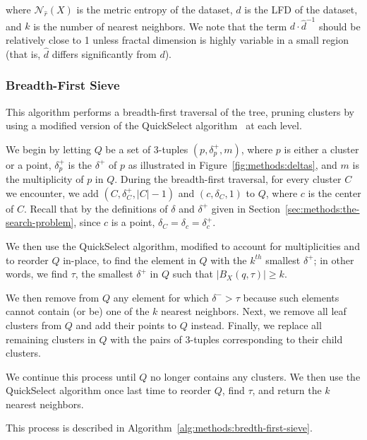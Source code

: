 where $\mathcal{N}_{\hat{r}}(X)$ is the metric entropy of the dataset, $d$ is the LFD of the dataset, and $k$ is the number of nearest neighbors.
We note that the term $d \cdot \hat{d}^{-1}$ should be relatively close to 1 unless fractal dimension is highly variable in a small region (that is, $\hat{d}$ differs significantly from $d$).


\subsubsection{Breadth-First Sieve}
\label{sec:methods:knn-search:bredth-first-sieve}

This algorithm performs a breadth-first traversal of the tree, pruning clusters by using a modified version of the QuickSelect algorithm~\cite{hoare1961algorithm} at each level.

We begin by letting $Q$ be a set of 3-tuples $(p, \delta^{+}_{p}, m)$, where $p$ is either a cluster or a point, $\delta^{+}_{p}$ is the $\delta^{+}$ of $p$ as illustrated in Figure~\ref{fig:methods:deltas}, and $m$ is the multiplicity of $p$ in $Q$.
During the breadth-first traversal, for every cluster $C$ we encounter, we add $(C, \delta^{+}_{C}, |C| - 1)$ and $(c, \delta_{C}, 1)$ to $Q$, where $c$ is the center of $C$.
Recall that by the definitions of $\delta$ and $\delta^{+}$ given in Section~\ref{sec:methods:the-search-problem}, since $c$ is a point, $\delta_{C} = \delta_{c} = \delta^{+}_{c}$.

We then use the QuickSelect algorithm, modified to account for multiplicities and to reorder $Q$ in-place, to find the element in $Q$ with the $k^{th}$ smallest $\delta^{+}$; in other words, we find $\tau$, the smallest $\delta^{+}$ in $Q$ such that $\left| B_X(q, \tau) \right| \geq k$.

We then remove from $Q$ any element for which $\delta^{-} > \tau$ because such elements cannot contain (or be) one of the $k$ nearest neighbors.
Next, we remove all leaf clusters from $Q$ and add their points to $Q$ instead.
Finally, we replace all remaining clusters in $Q$ with the pairs of 3-tuples corresponding to their child clusters.

We continue this process until $Q$ no longer contains any clusters.
We then use the QuickSelect algorithm once last time to reorder $Q$, find $\tau$, and return the $k$ nearest neighbors.

This process is described in Algorithm~\ref{alg:methods:bredth-first-sieve}. 

